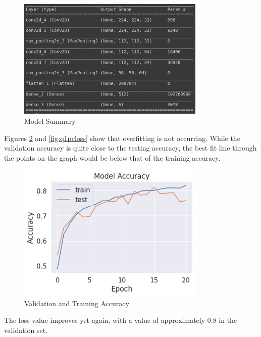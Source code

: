 \begin{figure}[H]
	\centering
	\includegraphics[width=0.8\textwidth]{images/q1/pc/q1pcmodel}
	\caption{Model Summary}
	\label{fig:q1pcmodel}
\end{figure}

Figures \ref{fig:q1pcacc} and \ref{fig:q1pcloss} show that overfitting is not
occurring. While the validation accuracy is quite close to the testing accuracy,
the best fit line through the points on the graph would be below that of the
training accuracy.

\begin{figure}[H]
	\centering
	\includegraphics[width=0.8\textwidth]{images/q1/pc/accuracy}
	\caption{Validation and Training Accuracy}
	\label{fig:q1pcacc}
\end{figure}

The loss value improves yet again, with a value of approximately 0.8 in the
validation set.


